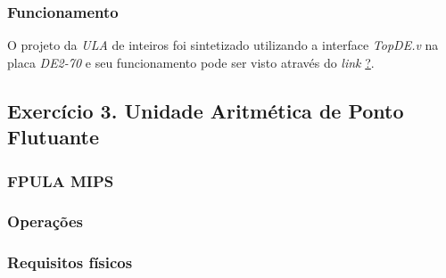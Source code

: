 \documentclass[12pt]{article}
\begin{document}
\subsubsection{Funcionamento}
\label{subsubsec:ulafunc}

O projeto da \textit{ULA} de inteiros foi sintetizado utilizando a interface \textit{TopDE.v} na placa \textit{DE2-70} e seu funcionamento pode ser visto através do \textit{link} \url{?}. 

\subsection{Exercício 3. Unidade Aritmética de Ponto Flutuante }
\label{subsec:ulafloat}

\subsubsection{FPULA MIPS}
\label{subsubsec:fpulamips}


\subsubsection{Operações}
\label{subsubsec:3op}


\subsubsection{Requisitos físicos}
\label{subsubsec:fpulafis}

\end{document}
